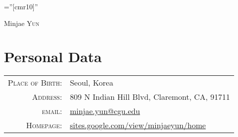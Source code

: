 \documentclass[a4paper,10pt]{article}
\begin{document}

\pagestyle{empty} %

\font\fb=''[cmr10]'' %

\par{\centering
		{\Huge Minjae \textsc{Yun}
	}\bigskip\par}

\section{Personal Data}
\begin{tabular}{rl}
    \textsc{Place of Birth:} & Seoul, Korea \\
    \textsc{Address:} & 809 N Indian Hill Blvd, Claremont, CA, 91711 \\
    \textsc{email:}     & \href{mailto:minjae.yun@cgu.edu}{minjae.yun@cgu.edu} \\
    \textsc{Homepage:} & \href{https://sites.google.com/view/minjaeyun/home}{sites.google.com/view/minjaeyun/home}
    \end{tabular}

\end{document}
